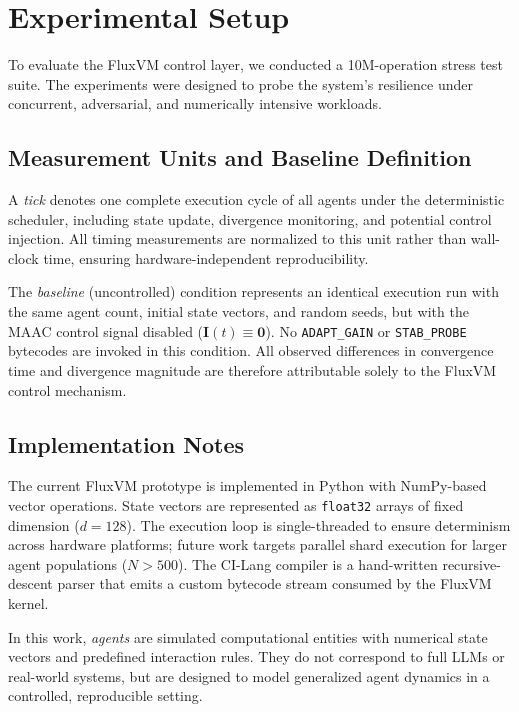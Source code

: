 \documentclass{article}
\begin{document}
\newpage

\section{Experimental Setup}
To evaluate the FluxVM control layer, we conducted a 10M-operation stress test suite. The experiments were designed to probe the system's resilience under concurrent, adversarial, and numerically intensive workloads.

\subsection{Measurement Units and Baseline Definition}
A \textit{tick} denotes one complete execution cycle of all agents under the deterministic scheduler, including state update, divergence monitoring, and potential control injection. All timing measurements are normalized to this unit rather than wall-clock time, ensuring hardware-independent reproducibility.

The \textit{baseline} (uncontrolled) condition represents an identical execution run with the same agent count, initial state vectors, and random seeds, but with the MAAC control signal disabled ($\mathbf{I}(t) \equiv \mathbf{0}$). No \texttt{ADAPT\_GAIN} or \texttt{STAB\_PROBE} bytecodes are invoked in this condition. All observed differences in convergence time and divergence magnitude are therefore attributable solely to the FluxVM control mechanism.

\subsection{Implementation Notes}
The current FluxVM prototype is implemented in Python with NumPy-based vector operations. State vectors are represented as \texttt{float32} arrays of fixed dimension ($d = 128$). The execution loop is single-threaded to ensure determinism across hardware platforms; future work targets parallel shard execution for larger agent populations ($N > 500$). The CI-Lang compiler is a hand-written recursive-descent parser that emits a custom bytecode stream consumed by the FluxVM kernel.

In this work, \textit{agents} are simulated computational entities with numerical state vectors and predefined interaction rules. They do not correspond to full LLMs or real-world systems, but are designed to model generalized agent dynamics in a controlled, reproducible setting.
\end{document}
